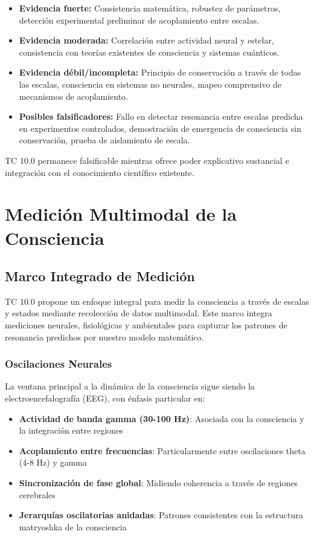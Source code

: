 \documentclass[12pt]{article}
\begin{document}
\begin{itemize}
    \item \textbf{Evidencia fuerte:} Consistencia matemática, robustez de parámetros, detección experimental preliminar de acoplamiento entre escalas.
    
    \item \textbf{Evidencia moderada:} Correlación entre actividad neural y estelar, consistencia con teorías existentes de consciencia y sistemas cuánticos.
    
    \item \textbf{Evidencia débil/incompleta:} Principio de conservación a través de todas las escalas, consciencia en sistemas no neurales, mapeo comprensivo de mecanismos de acoplamiento.
    
    \item \textbf{Posibles falsificadores:} Fallo en detectar resonancia entre escalas predicha en experimentos controlados, demostración de emergencia de consciencia sin conservación, prueba de aislamiento de escala.
\end{itemize}

TC 10.0 permanece falsificable mientras ofrece poder explicativo sustancial e integración con el conocimiento científico existente.

\section{Medición Multimodal de la Consciencia}

\subsection{Marco Integrado de Medición}

TC 10.0 propone un enfoque integral para medir la consciencia a través de escalas y estados mediante recolección de datos multimodal. Este marco integra mediciones neurales, fisiológicas y ambientales para capturar los patrones de resonancia predichos por nuestro modelo matemático.

\subsubsection{Oscilaciones Neurales}

La ventana principal a la dinámica de la consciencia sigue siendo la electroencefalografía (EEG), con énfasis particular en:

\begin{itemize}
    \item \textbf{Actividad de banda gamma (30-100 Hz)}: Asociada con la consciencia y la integración entre regiones
    \item \textbf{Acoplamiento entre frecuencias}: Particularmente entre oscilaciones theta (4-8 Hz) y gamma
    \item \textbf{Sincronización de fase global}: Midiendo coherencia a través de regiones cerebrales
    \item \textbf{Jerarquías oscilatorias anidadas}: Patrones consistentes con la estructura matryoshka de la consciencia
\end{itemize}
\end{document}
